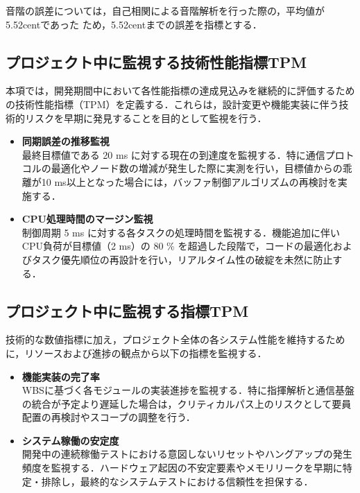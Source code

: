 \documentclass[lualatex,book,paper=a4paper,jafontsize=11.5pt,jafontscale=1.05]{jlreq}
\begin{document}
音階の誤差については，自己相関による音階解析を行った際の，平均値が5.52centであった
ため，5.52centまでの誤差を指標とする\cite{ref:onkai}．
\subsection{プロジェクト中に監視する技術性能指標TPM}
本項では，開発期間中において各性能指標の達成見込みを継続的に評価するための技術性能指標（TPM）を定義する．これらは，設計変更や機能実装に伴う技術的リスクを早期に発見することを目的として監視を行う．

\begin{itemize}
\item{\textbf{同期誤差の推移監視}}\\
最終目標値である 20 ms に対する現在の到達度を監視する．特に通信プロトコルの最適化やノード数の増減が発生した際に実測を行い，目標値からの乖離が10 ms以上となった場合には，バッファ制御アルゴリズムの再検討を実施する．
\item{\textbf{CPU処理時間のマージン監視}}\\
制御周期 5 ms に対する各タスクの処理時間を監視する．機能追加に伴いCPU負荷が目標値（2 ms）の 80 \% を超過した段階で，コードの最適化およびタスク優先順位の再設計を行い，リアルタイム性の破綻を未然に防止する．
\end{itemize}

\subsection{プロジェクト中に監視する指標TPM}
技術的な数値指標に加え，プロジェクト全体の各システム性能を維持するために，リソースおよび進捗の観点から以下の指標を監視する．

\begin{itemize}
\item{\textbf{機能実装の完了率}}\\
WBSに基づく各モジュールの実装進捗を監視する．特に指揮解析と通信基盤の統合が予定より遅延した場合は，クリティカルパス上のリスクとして要員配置の再検討やスコープの調整を行う．
\item{\textbf{システム稼働の安定度}}\\
開発中の連続稼働テストにおける意図しないリセットやハングアップの発生頻度を監視する．ハードウェア起因の不安定要素やメモリリークを早期に特定・排除し，最終的なシステムテストにおける信頼性を担保する．
\end{itemize}
\end{document}

